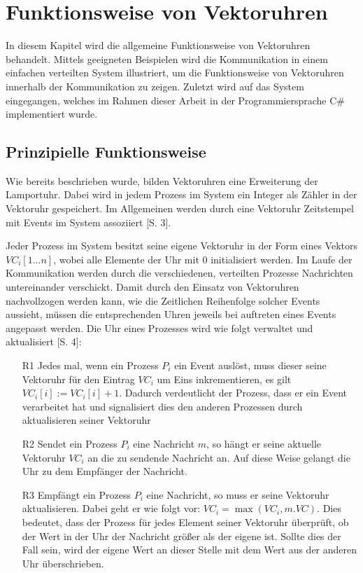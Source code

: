 \section{Funktionsweise von Vektoruhren}
\label{cap:funktionsweise}
In diesem Kapitel wird die allgemeine Funktionsweise von Vektoruhren behandelt. Mittels geeigneten Beispielen wird die Kommunikation in einem einfachen verteilten System illustriert, um die Funktionsweise von Vektoruhren innerhalb der Kommunikation zu zeigen. Zuletzt wird auf das System eingegangen, welches im Rahmen dieser Arbeit in der Programmiersprache C\# implementiert wurde.
\subsection{Prinzipielle Funktionsweise}
\label{prinzipFunktion}
Wie bereits beschrieben wurde, bilden Vektoruhren eine Erweiterung der Lamportuhr. Dabei wird in jedem Prozess im System ein Integer als Zähler in der Vektoruhr gespeichert. Im Allgemeinen werden durch eine Vektoruhr Zeitstempel mit Events im System assoziiert \cite{Baldoni:2002:FDC:1435723.1437765}[S. 3].

Jeder Prozess im System besitzt seine eigene Vektoruhr in der Form eines Vektors $VC_i[1...n]$, wobei alle Elemente der Uhr mit $0$ initialisiert werden. Im Laufe der Kommunikation werden durch die verschiedenen, verteilten Prozesse Nachrichten untereinander verschickt. Damit durch den Einsatz von Vektoruhren nachvollzogen werden kann, wie die Zeitlichen Reihenfolge solcher Events aussieht, müssen die entsprechenden Uhren jeweils bei auftreten eines Events angepasst werden.
Die Uhr eines Prozesses wird wie folgt verwaltet und aktualisiert \cite{Baldoni:2002:FDC:1435723.1437765}[S. 4]:

\begin{itemize}
	\item[R1]Jedes mal, wenn ein Prozess $P_i$ ein Event auslöst, muss dieser seine Vektoruhr für den Eintrag $VC_i$ um Eins inkrementieren, es gilt  $VC_i[i] := VC_i[i] + 1$. Dadurch verdeutlicht der Prozess, dass er ein Event verarbeitet hat und signalisiert dies den anderen Prozessen durch aktualisieren seiner Vektoruhr 
	\item[R2]Sendet ein Prozess $P_i$ eine Nachricht $m$, so hängt er seine aktuelle Vektoruhr $VC_i$ an die zu sendende Nachricht an. Auf diese Weise gelangt die Uhr zu dem Empfänger der Nachricht.
	\item[R3]Empfängt ein Prozess $P_i$ eine Nachricht, so muss er seine Vektoruhr aktualisieren. Dabei geht er wie folgt vor: $VC_i = \max(VC_i, m.VC)$. Dies bedeutet, dass der Prozess für jedes Element seiner Vektoruhr überprüft, ob der Wert in der Uhr der Nachricht größer als der eigene ist. Sollte dies der Fall sein, wird der eigene Wert an dieser Stelle mit dem Wert aus der anderen Uhr überschrieben.\label{R3}
\end{itemize}

